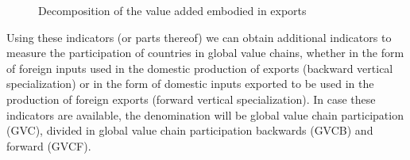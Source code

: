 \begin{figure}
\centering
\caption{Decomposition of the value added embodied in exports}
\label{fig:decomposition}
  \label{fig:decomposition}
\end{figure}

Using these indicators (or parts thereof) we can obtain additional indicators to
measure the participation of countries in global value chains, whether in the
form of foreign inputs used in the domestic production of exports (backward
vertical specialization) or in the form of domestic inputs exported to be used
in the production of foreign exports (forward vertical specialization). In case
these indicators are available, the denomination will be global value chain
participation (GVC), divided in global value chain participation backwards
(GVCB) and forward (GVCF).

